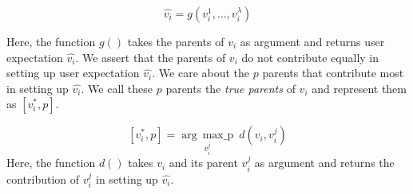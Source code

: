 $$\hat{v_i} = g(v_i^1, \ldots, v_i^\lambda)$$

Here, the function $g()$ takes the parents of $v_i$ as argument and returns user expectation $\hat{v_i}$.
\newline
\newline
We assert that the parents of $v_i$ do not contribute equally in setting up user expectation $\hat{v_i}$. We care about the $p$ parents that contribute most in setting up $\hat{v_i}$. We call these $p$ parents the \emph{true parents} of $v_i$ and represent them as $[v_i^*, p]$. 
  
$$[v_i^*,p] = \underset{v_i^j}{\operatorname{arg\,\,\,max\_p}}\ d(v_i,v_i^j)$$
Here, the function $d()$ takes $v_i$ and its parent $v_i^j$ as argument and returns the contribution of $v_i^j$ in setting up $\hat{v_i}$. 
  
  
  
  \newline
  
  


